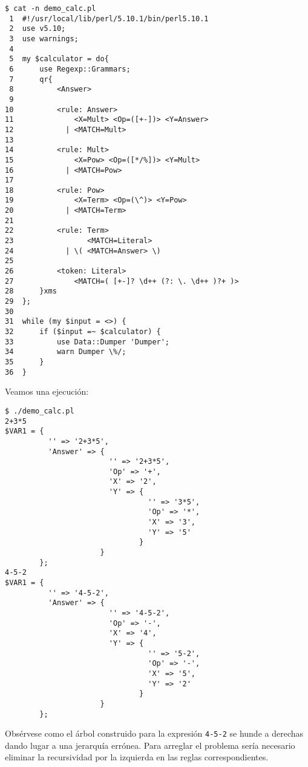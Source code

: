 \begin{verbatim}
$ cat -n demo_calc.pl
 1  #!/usr/local/lib/perl/5.10.1/bin/perl5.10.1
 2  use v5.10;
 3  use warnings;
 4
 5  my $calculator = do{
 6      use Regexp::Grammars;
 7      qr{
 8          <Answer>
 9
10          <rule: Answer>
11              <X=Mult> <Op=([+-])> <Y=Answer>
12            | <MATCH=Mult>
13
14          <rule: Mult>
15              <X=Pow> <Op=([*/%])> <Y=Mult>
16            | <MATCH=Pow>
17
18          <rule: Pow>
19              <X=Term> <Op=(\^)> <Y=Pow>
20            | <MATCH=Term>
21
22          <rule: Term>
23                 <MATCH=Literal>
24            | \( <MATCH=Answer> \)
25
26          <token: Literal>
27              <MATCH=( [+-]? \d++ (?: \. \d++ )?+ )>
28      }xms
29  };
30
31  while (my $input = <>) {
32      if ($input =~ $calculator) {
33          use Data::Dumper 'Dumper';
34          warn Dumper \%/;
35      }
36  }
\end{verbatim}

Veamos una ejecución:

\begin{verbatim}
$ ./demo_calc.pl
2+3*5
$VAR1 = {
          '' => '2+3*5',
          'Answer' => {
                        '' => '2+3*5',
                        'Op' => '+',
                        'X' => '2',
                        'Y' => {
                                 '' => '3*5',
                                 'Op' => '*',
                                 'X' => '3',
                                 'Y' => '5'
                               }
                      }
        };
4-5-2
$VAR1 = {
          '' => '4-5-2',
          'Answer' => {
                        '' => '4-5-2',
                        'Op' => '-',
                        'X' => '4',
                        'Y' => {
                                 '' => '5-2',
                                 'Op' => '-',
                                 'X' => '5',
                                 'Y' => '2'
                               }
                      }
        };
\end{verbatim}
Obsérvese como el árbol construido para la expresión \verb'4-5-2' 
se hunde a derechas dando lugar a una jerarquía errónea.
Para arreglar el problema sería necesario eliminar la 
recursividad por la izquierda en las reglas correspondientes.


